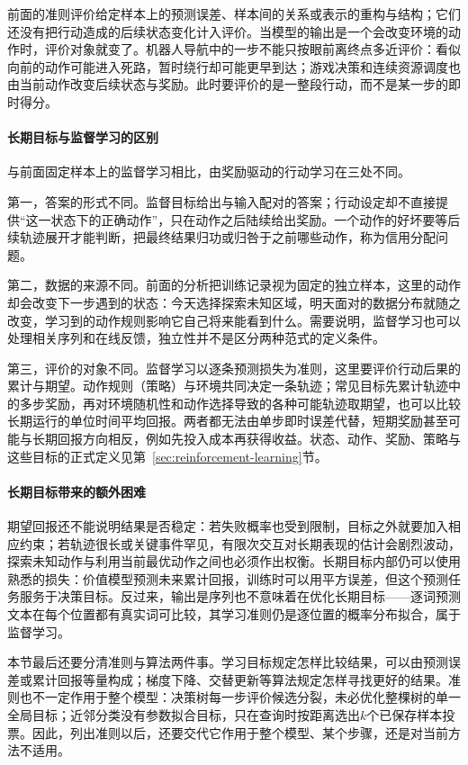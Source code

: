 前面的准则评价给定样本上的预测误差、样本间的关系或表示的重构与结构；它们还没有把行动造成的后续状态变化计入评价。当模型的输出是一个会改变环境的动作时，评价对象就变了。机器人导航中的一步不能只按眼前离终点多近评价：看似向前的动作可能进入死路，暂时绕行却可能更早到达；游戏决策和连续资源调度也由当前动作改变后续状态与奖励。此时要评价的是一整段行动，而不是某一步的即时得分。

\paragraph{长期目标与监督学习的区别}

与前面固定样本上的监督学习相比，由奖励驱动的行动学习在三处不同。

第一，答案的形式不同。监督目标给出与输入配对的答案；行动设定却不直接提供“这一状态下的正确动作”，只在动作之后陆续给出奖励。一个动作的好坏要等后续轨迹展开才能判断，把最终结果归功或归咎于之前哪些动作，称为信用分配问题。

第二，数据的来源不同。前面的分析把训练记录视为固定的独立样本，这里的动作却会改变下一步遇到的状态：今天选择探索未知区域，明天面对的数据分布就随之改变，学习到的动作规则影响它自己将来能看到什么。需要说明，监督学习也可以处理相关序列和在线反馈，独立性并不是区分两种范式的定义条件。

第三，评价的对象不同。监督学习以逐条预测损失为准则，这里要评价行动后果的累计与期望。动作规则（策略）与环境共同决定一条轨迹；常见目标先累计轨迹中的多步奖励，再对环境随机性和动作选择导致的各种可能轨迹取期望，也可以比较长期运行的单位时间平均回报。两者都无法由单步即时误差代替，短期奖励甚至可能与长期回报方向相反，例如先投入成本再获得收益。状态、动作、奖励、策略与这些目标的正式定义见第~\ref{sec:reinforcement-learning}节。

\paragraph{长期目标带来的额外困难}

期望回报还不能说明结果是否稳定：若失败概率也受到限制，目标之外就要加入相应约束；若轨迹很长或关键事件罕见，有限次交互对长期表现的估计会剧烈波动，探索未知动作与利用当前最优动作之间也必须作出权衡。长期目标内部仍可以使用熟悉的损失：价值模型预测未来累计回报，训练时可以用平方误差，但这个预测任务服务于决策目标。反过来，输出是序列也不意味着在优化长期目标——逐词预测文本在每个位置都有真实词可比较，其学习准则仍是逐位置的概率分布拟合，属于监督学习。

本节最后还要分清准则与算法两件事。学习目标规定怎样比较结果，可以由预测误差或累计回报等量构成；梯度下降、交替更新等算法规定怎样寻找更好的结果。准则也不一定作用于整个模型：决策树每一步评价候选分裂，未必优化整棵树的单一全局目标；近邻分类没有参数拟合目标，只在查询时按距离选出$k$个已保存样本投票。因此，列出准则以后，还要交代它作用于整个模型、某个步骤，还是对当前方法不适用。

